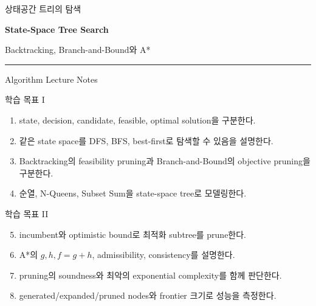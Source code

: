 \begin{frame}
\vspace*{12mm}
{\color{AlgoBlue}상태공간 트리의 탐색\par}
\vspace{1mm}
{\large\bfseries\color{AlgoBlue}State-Space Tree Search\par}
\vspace{4mm}
{\large Backtracking, Branch-and-Bound와 A*\par}
\vspace{6mm}
{\color{AlgoOrange}\rule{.55\linewidth}{.7pt}\par}
\vspace{6mm}
{\small Algorithm Lecture Notes\par}
\end{frame}
\begin{frame}{학습 목표 I}
\begin{enumerate}
\item state, decision, candidate, feasible, optimal solution을 구분한다.
\item 같은 state space를 DFS, BFS, best-first로 탐색할 수 있음을 설명한다.
\item Backtracking의 feasibility pruning과 Branch-and-Bound의 objective pruning을 구분한다.
\item 순열, N-Queens, Subset Sum을 state-space tree로 모델링한다.
\end{enumerate}
\end{frame}
\begin{frame}{학습 목표 II}
\begin{enumerate}
\setcounter{enumi}{4}
\item incumbent와 optimistic bound로 최적화 subtree를 prune한다.
\item A*의 \(g,h,f=g+h\), admissibility, consistency를 설명한다.
\item pruning의 soundness와 최악의 exponential complexity를 함께 판단한다.
\item generated/expanded/pruned nodes와 frontier 크기로 성능을 측정한다.
\end{enumerate}
\end{frame}
